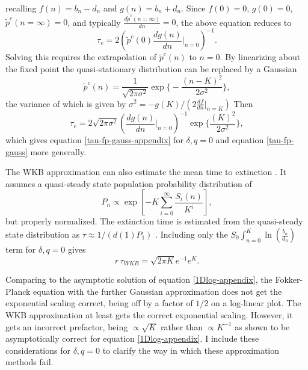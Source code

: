 recalling $f(n)=b_n-d_n$ and $g(n)=b_n+d_n$. 
Since $f(0)=0$, $g(0)=0$, $\widetilde{p}^c(n=\infty)=0$, and typically $\frac{d\widetilde{p}^c(n=\infty)}{dn}=0$, the above equation reduces to
\begin{equation}
\tau_e = 2\left( \widetilde{p}^c(0) \frac{dg(n)}{dn}\bigg\vert_{n=0} \right)^{-1}.
\end{equation}
Solving this requires the extrapolation of $\widetilde{p}^c(n)$ to $n=0$. 
By linearizing about the fixed point the quasi-stationary distribution can be replaced by a Gaussian \cite{Nisbet1982}
\begin{equation}
\widetilde{p}^c(n) = \frac{1}{\sqrt{2\pi\sigma^{2}}}\exp\Big\lbrace-\frac{(n-K)^2}{2\sigma^{2}}\Big\rbrace,
 \label{pc-gaussian}
\end{equation}
the variance of which is given by $\sigma^{2} = -g(K)/\left(2\frac{df}{dn}\bigg\vert_{n=K}\right)$
Then
\begin{equation}
\tau_e = 
2\sqrt{2\pi\sigma^{2}}
\left( \frac{dg(n)}{dn}\bigg\vert_{n=0} \right)^{-1}
\exp\Big\{\frac{(K)^2}{2\sigma^{2}}\Big\},
 \label{etime-approx2}
\end{equation}
which gives equation \ref{tau-fp-gauss-appendix} for $\delta,q=0$ and equation \ref{tau-fp-gauss} more generally. 

The WKB approximation can also estimate the mean time to extinction \cite{Assaf2016}. 
It assumes a quasi-steady state population probability distribution of
\begin{equation}
P_n \propto \exp\left[-K\sum_{i=0}^\infty \frac{S_i(n)}{K^i}\right],
\end{equation}
but properly normalized. 
The extinction time is estimated from the quasi-steady state distribution as $\tau \approx 1/(d(1)P_1)$ \cite{Nisbet1982,Assaf2016}. 
Including only the $S_0\int_{n=0}^{K} \ln\left(\frac{b_n}{d_n}\right)$ term for $\delta,q=0$ gives
\begin{equation}
r\,\tau_{WKB} = \sqrt{2\pi K}e^{-1}e^K. 
\end{equation}

Comparing to the asymptotic solution of equation \ref{1Dlog-appendix}, the Fokker-Planck equation with the further Gaussian approximation does not get the exponential scaling correct, being off by a factor of $1/2$ on a log-linear plot. 
The WKB approximation at least gets the correct exponential scaling. 
However, it gets an incorrect prefactor, being $\propto \sqrt{K}$ rather than $\propto K^{-1}$ as shown to be asymptotically correct for equation \ref{1Dlog-appendix}. 
I include these considerations for $\delta,q=0$ to clarify the way in which these approximation methods fail. 

